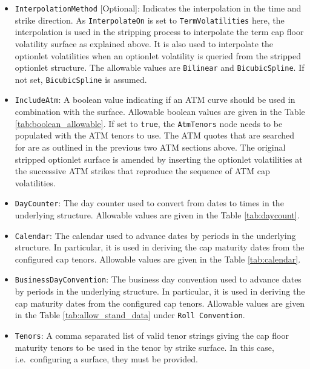 \begin{itemize}
\item \lstinline!InterpolationMethod! [Optional]:
Indicates the interpolation in the time and strike direction. As \lstinline!InterpolateOn! is set to \lstinline!TermVolatilities! here, the interpolation is used in the stripping process to interpolate the term cap floor volatility surface as explained above. It is also used to interpolate the optionlet volatilities when an optionlet volatility is queried from the stripped optionlet structure. The allowable values are \lstinline!Bilinear! and \lstinline!BicubicSpline!. If not set, \lstinline!BicubicSpline! is assumed.

\item \lstinline!IncludeAtm!:
A boolean value indicating if an ATM curve should be used in combination with the surface. Allowable boolean values are given in the Table \ref{tab:boolean_allowable}. If set to \lstinline!true!, the \lstinline!AtmTenors! node needs to be populated with the ATM tenors to use. The ATM quotes that are searched for are as outlined in the previous two ATM sections above. The original stripped optionlet surface is amended by inserting the optionlet volatilities at the successive ATM strikes that reproduce the sequence of ATM cap volatilities.

\item \lstinline!DayCounter!:
The day counter used to convert from dates to times in the underlying structure. Allowable values are given in the Table \ref{tab:daycount}.

\item \lstinline!Calendar!:
The calendar used to advance dates by periods in the underlying structure. In particular, it is used in deriving the cap maturity dates from the configured cap tenors. Allowable values are given in the Table \ref{tab:calendar}.

\item \lstinline!BusinessDayConvention!:
The business day convention used to advance dates by periods in the underlying structure. In particular, it is used in deriving the cap maturity dates from the configured cap tenors. Allowable values are given in the Table \ref{tab:allow_stand_data} under \lstinline!Roll Convention!.

\item \lstinline!Tenors!:
A comma separated list of valid tenor strings giving the cap floor maturity tenors to be used in the tenor by strike surface. In this case, i.e.\ configuring a surface, they must be provided.


\end{itemize}
